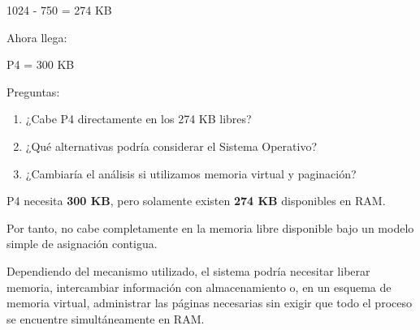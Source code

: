 \documentclass[
  spanish,
  letterpaper,
]{scrbook}
\newenvironment{Shaded}{\begin{snugshade}}{\end{snugshade}}
\newcommand{\NormalTok}[1]{\textcolor[rgb]{0.00,0.23,0.31}{#1}}
\providecommand{\tightlist}{%
  \setlength{\itemsep}{0pt}\setlength{\parskip}{0pt}}
\begin{document}
\begin{Shaded}
\begin{Highlighting}[]
\NormalTok{1024 {-} 750 = 274 KB}
\end{Highlighting}
\end{Shaded}

Ahora llega:

\begin{Shaded}
\begin{Highlighting}[]
\NormalTok{P4 = 300 KB}
\end{Highlighting}
\end{Shaded}

Preguntas:

\begin{enumerate}
\def\labelenumi{\arabic{enumi}.}
\tightlist
\item
  ¿Cabe P4 directamente en los 274 KB libres?
\item
  ¿Qué alternativas podría considerar el Sistema Operativo?
\item
  ¿Cambiaría el análisis si utilizamos memoria virtual y paginación?
\end{enumerate}

\begin{tcolorbox}[enhanced jigsaw, arc=.35mm, bottomrule=.15mm, bottomtitle=1mm, breakable, colback=white, colbacktitle=quarto-callout-tip-color!10!white, colframe=quarto-callout-tip-color-frame, coltitle=black, left=2mm, leftrule=.75mm, opacityback=0, opacitybacktitle=0.6, rightrule=.15mm, title=\textcolor{quarto-callout-tip-color}{\faLightbulb}\hspace{0.5em}{✅ Analicemos}, titlerule=0mm, toprule=.15mm, toptitle=1mm]

P4 necesita \textbf{300 KB}, pero solamente existen \textbf{274 KB}
disponibles en RAM.

Por tanto, no cabe completamente en la memoria libre disponible bajo un
modelo simple de asignación contigua.

Dependiendo del mecanismo utilizado, el sistema podría necesitar liberar
memoria, intercambiar información con almacenamiento o, en un esquema de
memoria virtual, administrar las páginas necesarias sin exigir que todo
el proceso se encuentre simultáneamente en RAM.

\end{tcolorbox}
\end{document}
